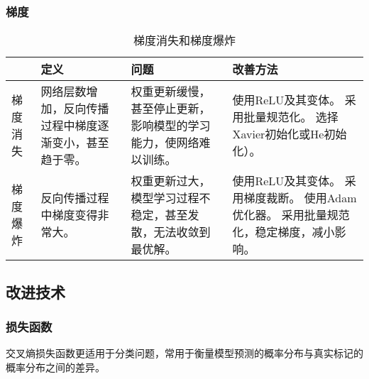 \documentclass[
12pt, %
a4paper, 
oneside, %
headinclude,footinclude, %
]{scrartcl}
\begin{document}
\subsubsection[梯度]{梯度}
\begin{table}[H]
\centering
\begin{tabular}{|p{0.5cm}|p{3.5cm}|p{3.5cm}|p{8cm}|}
\hline
 & 定义 & 问题 & 改善方法 \\
\hline
梯度消失 & 网络层数增加，反向传播过程中梯度逐渐变小，甚至趋于零。 & 权重更新缓慢，甚至停止更新，影响模型的学习能力，使网络难以训练。 & 使用ReLU及其变体。 \newline 采用批量规范化。 \newline 选择Xavier初始化或He初始化）。 \\
\hline
梯度爆炸 & 反向传播过程中梯度变得非常大。 & 权重更新过大，模型学习过程不稳定，甚至发散，无法收敛到最优解。 & 使用ReLU及其变体。 \newline 采用梯度裁断。 \newline 使用Adam优化器。 \newline 采用批量规范化，稳定梯度，减小影响。 \\
\hline
\end{tabular}
\caption{梯度消失和梯度爆炸}
\end{table}
\subsection[改进技术]{改进技术}
\subsubsection[损失函数]{损失函数}
交叉熵损失函数更适用于分类问题，常用于衡量模型预测的概率分布与真实标记的概率分布之间的差异。
\end{document}

